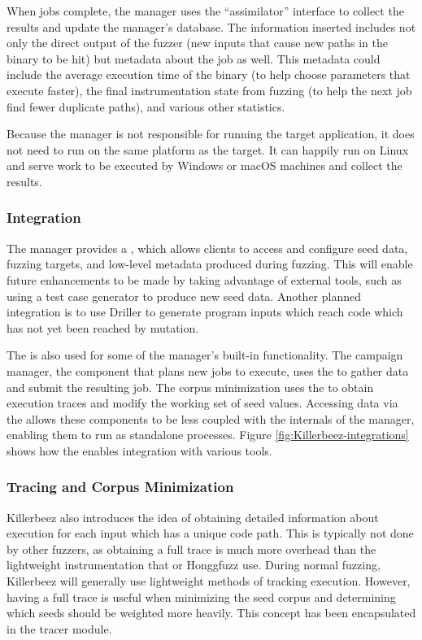 When jobs complete, the manager uses the \BOINC{} ``assimilator'' interface to
collect the results and update the manager's database. The information inserted
includes not only the direct output of the fuzzer (new inputs that cause new
paths in the binary to be hit) but metadata about the job as well. This metadata
could include the average execution time of the binary (to help choose
parameters that execute faster), the final instrumentation state from fuzzing
(to help the next job find fewer duplicate paths), and various other statistics.

Because the manager is not responsible for running the target application, it
does not need to run on the same platform as the target.  It can happily run on Linux and
serve work to be executed by Windows or macOS machines and collect the
results.

\subsubsection{Integration}
The manager provides a \REST{} \API{}, which allows clients
to access and configure seed data, fuzzing targets, and low-level metadata
produced during fuzzing.
This will enable future enhancements to be made by taking advantage of
external tools, such as
using a test case generator to produce new seed data. Another planned integration
is to use Driller\cite{driller} to generate program inputs which reach
code which has not yet been reached by mutation.

The \REST{} \API{} is also used for some of the manager's built-in
functionality. The campaign manager, the component that plans new jobs to
execute, uses the \REST{} \API{} to gather data and submit the resulting job.
The corpus minimization uses the \REST{} \API{} to obtain execution traces and
modify the working set of seed values. Accessing data via the \REST{} \API{}
allows these components to be less coupled with the internals of the manager,
enabling them to run as standalone processes. Figure
\ref{fig:Killerbeez-integrations} shows how the \REST{} \API{} enables
integration with various tools.

\subsubsection{Tracing and Corpus Minimization} \label{Corpus Minimization}
Killerbeez also introduces the idea of obtaining detailed information about
execution for each input which has a unique code path.  This is typically
not done by other fuzzers, as obtaining a full trace is much more overhead than
the lightweight instrumentation that \AFL{} or Honggfuzz use. During
normal fuzzing, Killerbeez will generally use lightweight methods of tracking
execution. However, having a full trace is useful when minimizing the seed corpus
and determining which seeds should be weighted more heavily. This concept has
been encapsulated in the tracer module.

